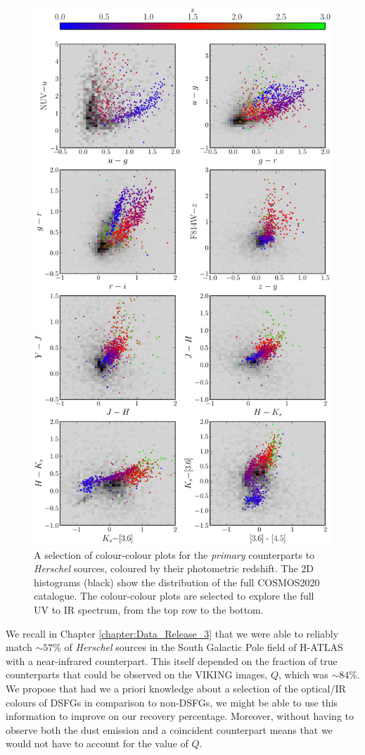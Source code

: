 \begin{figure}
	\centering
	\includegraphics[width=0.85\columnwidth, height=0.9\textheight]{Figures/smg_colours.pdf}
	\caption[Selection of colour-colour diagrams]{A selection of colour-colour plots for the \textit{primary} counterparts to \textit{Herschel} sources, coloured by their photometric redshift. The 2D histograms (black) show the distribution of the full COSMOS2020 catalogue. The colour-colour plots are selected to explore the full UV to IR spectrum, from the top row to the bottom.}
	\label{fig:smg_colours}
\end{figure}

We recall in Chapter \ref{chapter:Data_Release_3} that we were able to reliably match $\sim 57\%$ of \textit{Herschel} sources in the South Galactic Pole field of H-ATLAS with a near-infrared counterpart. This itself depended on the fraction of true counterparts that could be observed on the VIKING images, $Q$, which was $\sim 84\%$. We propose that had we a priori knowledge about a selection of the optical/IR colours of DSFGs in comparison to non-DSFGs, we might be able to use this information to improve on our recovery percentage. Moreover, without having to observe both the dust emission and a coincident counterpart means that we would not have to account for the value of $Q$.

